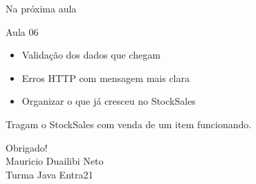\documentclass[aspectratio=169,11pt]{beamer}
\begin{document}
\begin{frame}{Na próxima aula}
  \begin{block}{Aula 06}
    \begin{itemize}
      \item Validação dos dados que chegam
      \item Erros HTTP com mensagem mais clara
      \item Organizar o que já cresceu no StockSales
    \end{itemize}
  \end{block}

  \vspace{0.6em}
  Tragam o StockSales com venda de um item funcionando.
\end{frame}

\begin{frame}
  \begin{center}
    \Huge Obrigado!\\[1.2em]
    \normalsize Mauricio Duailibi Neto\\
    Turma Java Entra21
  \end{center}
\end{frame}
\end{document}

